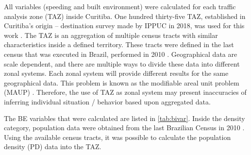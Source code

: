 All variables (speeding and built environment) were calculated for each traffic analysis zone (TAZ) inside Curitiba. One hundred thirty-five TAZ, established in Curitiba's origin – destination survey made by IPPUC in 2018, was used for this work \cite{IPPUC2018b}. The TAZ is an aggregation of multiple census tracts with similar characteristics inside a defined territory. These tracts were defined in the last census that was executed in Brazil, performed in 2010 \cite{IBGE2010}. Geographical data are scale dependent, and there are multiple ways to divide these data into different zonal systems. Each zonal system will provide different results for the same geographical data. This problem is known as the modifiable areal unit problem (MAUP) \cite{wongModifiableArealUnit2009}. Therefore, the use of TAZ as zonal system may present inaccuracies of inferring individual situation / behavior based upon aggregated data.  


The BE variables that were calculated are listed in \autoref{tab:bivar}. Inside the density category, population data were obtained from the last Brazilian Census in 2010 \cite{IBGE2010}. Using the available census tracts, it was possible to calculate the population density (PD) data into the TAZ.


